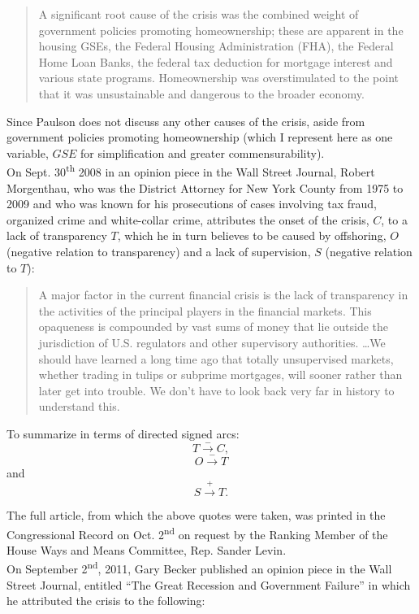 \documentclass[12pt]{article}
\newcommand{\ts}{\textsuperscript}
\begin{document}
\begin{quotation}
A significant root cause of the crisis was the combined weight of government policies promoting homeownership; these are apparent in the housing GSEs, the Federal Housing Administration (FHA), the Federal Home Loan Banks, the federal tax deduction for mortgage interest and various state programs. Homeownership was overstimulated to the point that it was unsustainable and dangerous to the broader economy.
\end{quotation}

Since Paulson does not discuss any other causes of the crisis, aside from government policies promoting homeownership (which I represent here as one variable, $GSE$ for simplification and greater commensurability).\\

On Sept. 30\ts{th} 2008 in an opinion piece in the Wall Street Journal, Robert Morgenthau, who was the District Attorney for New York County from 1975 to 2009 and who was known for his prosecutions of cases involving tax fraud, organized crime and white-collar crime, attributes the onset of the crisis, $C$, to a lack of transparency $T$, which he in turn believes to be caused by offshoring, $O$ (negative relation to transparency) and a lack of supervision, $S$ (negative relation to $T$):

\begin{quotation}
A major factor in the current financial crisis is the lack of transparency in the activities of the principal players in the financial markets. This opaqueness is compounded by vast sums of money that lie outside the jurisdiction of U.S. regulators and other supervisory authorities. \ldots We should have learned a long time ago that totally unsupervised markets, whether trading in tulips or subprime mortgages, will sooner rather than later get into trouble. We don't have to look back very far in history to understand this.
\end{quotation}
To summarize in terms of directed signed arcs:
$$T \xrightarrow{-} C,$$
$$O \xrightarrow{-} T$$
and
$$S \xrightarrow{+} T.$$

The full article, from which the above quotes were taken, was printed in the Congressional Record on Oct. 2\ts{nd} on request by the Ranking Member of the House Ways and Means Committee, Rep. Sander Levin.\\

On September 2\ts{nd}, 2011, Gary Becker published an opinion piece in the Wall Street Journal, entitled ``The Great Recession and Government Failure'' in which he attributed the crisis to the following:
\end{document}
